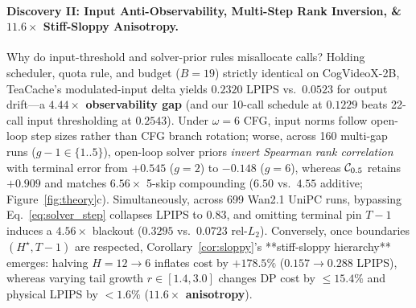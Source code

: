 \paragraph{Discovery II: Input Anti-Observability, Multi-Step Rank Inversion, \& $11.6\times$ Stiff-Sloppy Anisotropy.}
Why do input-threshold and solver-prior rules misallocate calls? Holding scheduler, quota rule, and budget ($B=19$) strictly identical on CogVideoX-2B, TeaCache's modulated-input delta yields $0.2320$ LPIPS vs.\ $\mathbf{0.0523}$ for output drift---a \textbf{$4.44\times$ observability gap} (and our 10-call schedule at $0.1229$ beats 22-call input thresholding at $0.2543$). Under $\omega=6$ CFG, input norms follow open-loop step sizes rather than CFG branch rotation; worse, across 160 multi-gap runs ($g - 1 \in \{1..5\}$), open-loop solver priors \emph{invert Spearman rank correlation} with terminal error from $+0.545$ ($g=2$) to $\mathbf{-0.148}$ ($g=6$), whereas $\mathcal{C}_{0.5}$ retains $+0.909$ and matches $6.56\times$ 5-skip compounding ($6.50$ vs.\ $4.55$ additive; Figure~\ref{fig:theory}c). Simultaneously, across 699 Wan2.1 UniPC runs, bypassing Eq.~\eqref{eq:solver_step} collapses LPIPS to $0.83$, and omitting terminal pin $T-1$ induces a $4.56\times$ blackout ($0.3295$ vs.\ $0.0723$ rel-$L_2$). Conversely, once boundaries $(H^\star, T-1)$ are respected, Corollary~\ref{cor:sloppy}'s **stiff-sloppy hierarchy** emerges: halving $H = 12 \to 6$ inflates cost by $+178.5\%$ ($0.157 \to 0.288$ LPIPS), whereas varying tail growth $r \in [1.4, 3.0]$ changes DP cost by $\le 15.4\%$ and physical LPIPS by $<1.6\%$ (\textbf{$11.6\times$ anisotropy}).


